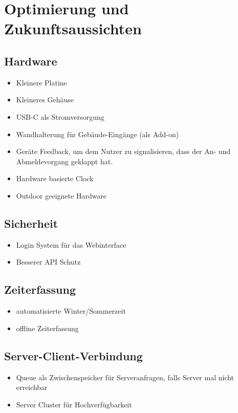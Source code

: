 \documentclass[../main.tex]{subfiles}
\begin{document}
\section{Optimierung und Zukunftsaussichten}

\subsection{Hardware}
\begin{itemize}
  \item Kleinere Platine
  \item Kleineres Gehäuse
  \item USB-C als Stromversorgung
  \item Wandhalterung für Gebäude-Eingänge (als Add-on)
  \item Geräte Feedback, um dem Nutzer zu signalisieren, dass der An- und Abmeldevorgang geklappt hat.
  \item Hardware basierte Clock
  \item Outdoor geeignete Hardware
\end{itemize}

\subsection{Sicherheit}
\begin{itemize}
    \item Login System für das Webinterface 
    \item Besserer API Schutz
\end{itemize}

\subsection{Zeiterfassung}
\begin{itemize} 
    \item automatisierte Winter/Sommerzeit
    \item offline Zeiterfassung
\end{itemize}

\subsection{Server-Client-Verbindung}
\begin{itemize} 
    \item Queue als Zwischenspeicher für Serveranfragen, falls Server mal nicht erreichbar
    \item Server Cluster für Hochverfügbarkeit
\end{itemize}
\end{document}
